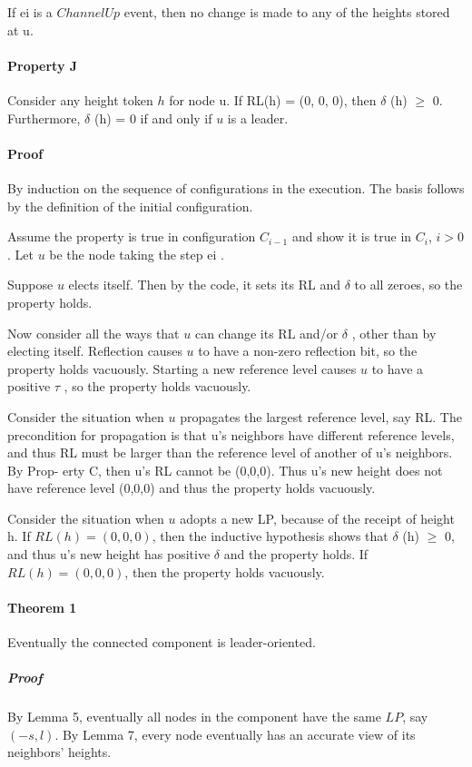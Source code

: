 If ei is a $ChannelUp$ event, then no change is made to any of the heights stored at u.

\paragraph{Property J}Consider any height token $h$ for node u. If RL(h) = (0, 0, 0), then $\delta$ (h) $\geq$ 0. Furthermore, $\delta$ (h) = 0 if and only if $u$ is a leader.

\paragraph{Proof}By induction on the sequence of configurations in the execution. The basis follows by the definition of the initial configuration.

Assume the property is true in configuration $C_{i-1}$ and show it is true in $C_i$, $i > 0$. Let $u$ be the node taking the step ei .

Suppose $u$ elects itself. Then by the code, it sets its RL and $\delta$ to all zeroes, so the property holds.

Now consider all the ways that $u$ can change its RL and/or $\delta$ , other than by electing itself. Reflection causes $u$ to have a non-zero reflection bit, so the property holds vacuously. Starting a new reference level causes $u$ to have a positive $\tau$ , so the property holds vacuously.

Consider the situation when $u$ propagates the largest reference level, say RL. The precondition for propagation is that u’s neighbors have different reference levels, and thus RL must be larger than the reference level of another of u’s neighbors. By Prop- erty C, then u’s RL cannot be (0,0,0). Thus u’s new height does not have reference level (0,0,0) and thus the property holds vacuously.

Consider the situation when $u$ adopts a new LP, because of the receipt of height h. If $RL(h) = (0, 0, 0)$, then the inductive hypothesis shows that $\delta$ (h) $\geq$ 0, and thus u’s new height has positive $\delta$ and the property holds. If $RL(h) = (0, 0, 0)$, then the property holds vacuously.

\paragraph{Theorem 1}Eventually the connected component is leader-oriented.
\subparagraph{Proof}By Lemma 5, eventually all nodes in the component have the same $LP$, say $(-s, l)$. By Lemma 7, every node eventually has an accurate view of its neighbors’ heights. 

